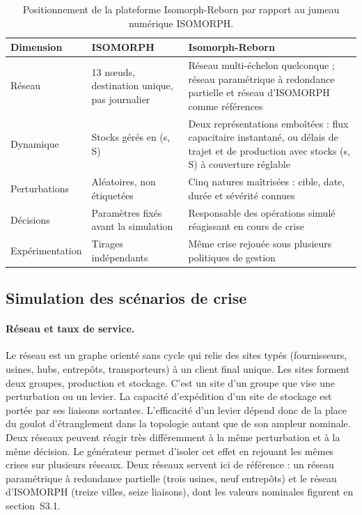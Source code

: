 \begin{table}[htbp]
\caption{Positionnement de la plateforme Isomorph-Reborn par rapport au jumeau numérique ISOMORPH.}
\label{tab:isomorph}
\footnotesize
\begin{tabularx}{\textwidth}{@{}P{2.3cm}P{3cm}L@{}}
\toprule
\textbf{Dimension} & \textbf{ISOMORPH} & \textbf{Isomorph-Reborn} \\
\toprule
Réseau & 13 nœuds, destination unique, pas journalier & Réseau multi-échelon quelconque ; réseau paramétrique à redondance partielle et réseau d'ISOMORPH comme références \\
\midrule
Dynamique & Stocks gérés en (s, S) & Deux représentations emboîtées : flux capacitaire instantané, ou délais de trajet et de production avec stocks (s, S) à couverture réglable \\
\midrule
Perturbations & Aléatoires, non étiquetées & Cinq natures maîtrisées : cible, date, durée et sévérité connues \\
\midrule
Décisions & Paramètres fixés avant la simulation & Responsable des opérations simulé réagissant en cours de crise \\
\midrule
Expérimentation & Tirages indépendants & Même crise rejouée sous plusieurs politiques de gestion \\
\bottomrule
\end{tabularx}
\end{table}

\subsection{Simulation des scénarios de crise}
\label{sec:3.2}

\paragraph{Réseau et taux de service.} Le réseau est un graphe orienté sans cycle qui relie des sites typés (fournisseurs, usines, hubs, entrepôts, transporteurs) à un client final unique. Les sites forment deux groupes, production et stockage. C'est un site d'un groupe que vise une perturbation ou un levier. La capacité d'expédition d'un site de stockage est portée par ses liaisons sortantes. L'efficacité d'un levier dépend donc de la place du goulot d'étranglement dans la topologie autant que de son ampleur nominale. Deux réseaux peuvent réagir très différemment à la même perturbation et à la même décision. Le générateur permet d'isoler cet effet en rejouant les mêmes crises sur plusieurs réseaux. Deux réseaux servent ici de référence : un réseau paramétrique à redondance partielle (trois usines, neuf entrepôts) et le réseau d'ISOMORPH (treize villes, seize liaisons), dont les valeurs nominales figurent en section~S3.1.

